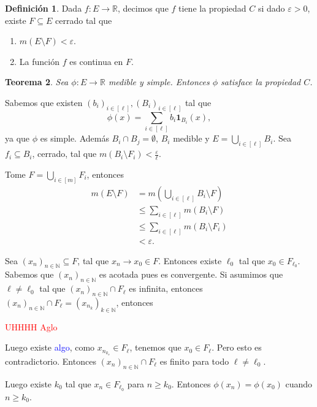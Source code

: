 \documentclass[12pt]{article}
\theoremstyle{plain}
\newtheorem{Th}{Teorema}[subsection]   %
\theoremstyle{definition}
\newtheorem{Def}[Th]{Definición}       %
\theoremstyle{remark}
\numberwithin{equation}{section}
\newcommand{\bN}{\mathbb{N}}        %
\newcommand{\bR}{\mathbb{R}}        %
\renewcommand{\geq}{\geqslant}      %
\renewcommand{\leq}{\leqslant}      %
\renewcommand{\:}{\colon}           %
\newcommand{\bonj}[1]{\left\lbrack#1\right\rbrack}
\begin{document}
\begin{multicols}{2}
\begin{Def}
  Dada $f\: E\to\bR$, decimos que $f$ tiene la propiedad $C$ si dado $\varepsilon>0$, existe $F\subseteq E$ cerrado tal que
  \begin{enumerate}
    \item $m(E\setminus F)<\varepsilon$.
    \item La función $f$ es continua en $F$.
  \end{enumerate}
\end{Def}

\begin{Th}
  Sea $\phi\: E\to\bR$ medible y simple. Entonces $\phi$ satisface la propiedad $C$.
\end{Th}

\begin{ptcbp}
Sabemos que existen $(b_i)_{i\in\bonj{\ell}},(B_i)_{i\in\bonj{\ell}}$ tal que
$$\phi(x)=\sum_{i\in\bonj{\ell}}b_i\mathbf{1}_{B_i}(x),$$
ya que $\phi$ es simple. Además $B_i\cap B_j=\emptyset$, $B_i$ medible y $E=\bigcup_{i\in\bonj{\ell}}B_i$. Sea $f_i\subseteq B_i$, cerrado, tal que $m(B_i\setminus F_i)<\frac{\varepsilon}{\ell}$.\par
Tome $F=\bigcup_{i\in\bonj{m}}F_i$, entonces
\begin{align*}
  m(E\setminus F) &=m(\bigcup_{i\in\bonj{\ell}}B_i\setminus F)\\
  &\leq \sum_{i\in\bonj{\ell}}m(B_i\setminus F)\\
  &\leq \sum_{i\in\bonj{\ell}}m(B_i\setminus F_i)\\
  &<\varepsilon.
\end{align*}

Sea $(x_n)_{n\in\bN}\subseteq F$, tal que $x_n\to x_0\in F$. Entonces existe $\ell_0$ tal que $x_0\in F_{\ell_0}$. Sabemos que $(x_n)_{n\in\bN}$ es acotada pues es convergente. Si asumimos que $\ell\neq \ell_0$ tal que $(x_n)_{n\in\bN}\cap F_\ell$ es infinita, entonces $(x_n)_{n\in\bN}\cap F_\ell=(x_{n_k})_{k\in\bN}$, entonces\par
\textcolor{red}{UHHHH Aglo}\par
Luego existe \textcolor{blue}{algo}, como $x_{n_{k_s}}\in F_\ell$, tenemos que $x_0\in F_\ell$. Pero esto es contradictorio. Entonces $(x_n)_{n\in\bN}\cap F_\ell$ es finito para todo $\ell\neq\ell_0$.\par
Luego existe $k_0$ tal que $x_n\in F_{\ell_0}$ para $n\geq k_0$. Entonces $\phi(x_n)=\phi(x_0)$ cuando $n\geq k_0$.
\end{ptcbp}


\end{multicols}
\end{document}
